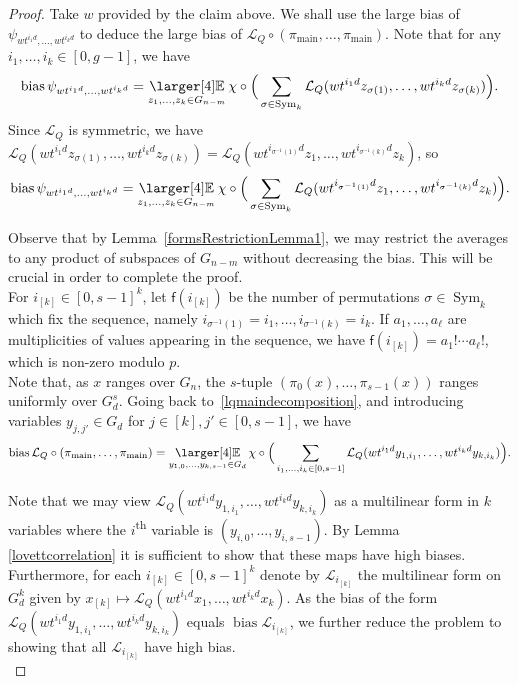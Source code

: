 \documentclass[a4paper,11pt]{article}
\theoremstyle{definition}
\newcommand{\tss}[1]{\textsuperscript{#1}}
\newcommand{\on}[1]{
	\operatorname{#1}
}
\newcommand{\exx}{
  \mathop{
    \mathchoice{\vcenter{\hbox{\larger[4]$\mathbb{E}$}}}
               {\kern0pt\mathbb{E}}
               {\kern0pt\mathbb{E}}
               {\kern0pt\mathbb{E}}
  }\displaylimits
}
\begin{document}
\begin{proof}
    Take $w$ provided by the claim above. We shall use the large bias of $\psi_{wt^{i_1d}, \ldots, wt^{i_kd}}$ to deduce the large bias of $\mathcal{L}_Q \circ (\pi_{\on{main}}, \dots, \pi_{\on{main}})$. Note that for any $i_1, \dots, i_k \in [0,g-1]$, we have
    \[\on{bias} \psi_{wt^{i_1d}, \ldots, wt^{i_kd}} = \exx_{z_1, \dots, z_k \in G_{n-m}} \chi\circ\Big(\sum_{\sigma \in \on{Sym}_k} \mathcal{L}_Q(wt^{i_1d} z_{\sigma(1)}, \dots, wt^{i_k d} z_{\sigma(k)})\Big).\]
    Since $\mathcal{L}_Q$ is symmetric, we have $\mathcal{L}_Q(wt^{i_1d} z_{\sigma(1)}, \dots, wt^{i_k d} z_{\sigma(k)}) = \mathcal{L}_Q(wt^{i_{\sigma^{-1}(1)}d} z_{1}, \dots, wt^{i_{\sigma^{-1}(k)} d} z_{k})$, so
    \[\on{bias} \psi_{wt^{i_1d}, \ldots, wt^{i_kd}} = \exx_{z_1, \dots, z_k \in G_{n- m}} \chi\circ\Big(\sum_{\sigma \in \on{Sym}_k} \mathcal{L}_Q(wt^{i_{\sigma^{-1}(1)}d} z_{1}, \dots, wt^{i_{\sigma^{-1}(k)} d} z_{k})\Big).\]

    Observe that by Lemma~\ref{formsRestrictionLemma1}, we may restrict the averages to any product of subspaces of $G_{n-m}$ without decreasing the bias. This will be crucial in order to complete the proof.\\

    For $i_{[k]} \in [0,s-1]^k$, let $\mathsf{f}(i_{[k]})$ be the number of permutations $\sigma \in \on{Sym}_k$ which fix the sequence, namely $i_{\sigma^{-1}(1)} = i_1, \dots, i_{\sigma^{-1}(k)} = i_k$. If $a_1, \dots, a_\ell$ are multiplicities of values appearing in the sequence, we have $\mathsf{f}(i_{[k]}) = a_1! \cdots a_\ell!$, which is non-zero modulo $p$.\\

    Note that, as $x$ ranges over $G_n$, the $s$-tuple $(\pi_0(x), \dots, \pi_{s-1}(x))$ ranges uniformly over $G_d^s$. Going back to~\eqref{lqmaindecomposition}, and introducing variables $y_{j,j'} \in G_d$ for $j \in [k], j' \in [0,s-1]$, we have 
    \begin{align*}
        \on{bias} \mathcal{L}_Q \circ (\pi_{\on{main}}, \dots,\pi_{\on{main}}) = \exx_{y_{1,0}, \dots, y_{k, s-1} \in G_d} \chi\circ\Big(\sum_{i_1, \dots, i_k \in [0, s-1]} \mathcal{L}_Q(wt^{i_1d} y_{1, i_1}, \dots, wt^{i_kd} y_{k, i_k})\Big).
    \end{align*}

    Note that we may view $\mathcal{L}_Q(wt^{i_1d} y_{1, i_1}, \dots, wt^{i_kd} y_{k, i_k})$ as a multilinear form in $k$ variables where the $i$\tss{th} variable is $(y_{i,0}, \dots, y_{i, s-1})$. By Lemma \ref{lovettcorrelation} it is sufficient to show that these maps have high biases. Furthermore, for each $i_{[k]}\in [0,s-1]^k$ denote by $\mathcal{L}_{i_{[k]}}$ the multilinear form on $G_d^k$ given by $x_{[k]} \mapsto  \mathcal{L}_Q(wt^{i_1d} x_1, \dots, wt^{i_kd} x_k)$.
    As the bias of the form $\mathcal{L}_Q(wt^{i_1d} y_{1, i_1}, \dots, wt^{i_kd} y_{k, i_k})$ equals $\on{bias} \mathcal{L}_{i_{[k]}}$, we further reduce the problem to showing that all $\mathcal{L}_{i_{[k]}}$ have high bias.\\


\end{proof}
\end{document}
